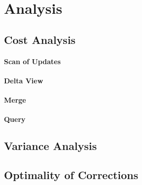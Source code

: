 \section{Analysis}

\subsection{Cost Analysis}
\paragraph{Scan of Updates}
\paragraph{Delta View}
\paragraph{Merge}
\paragraph{Query}

\subsection{Variance Analysis}

\subsection{Optimality of Corrections}